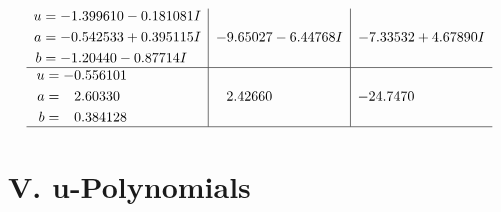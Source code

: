 \documentclass[1p]{elsarticle_modified}
\theoremstyle{definition}
\begin{document}
$$\begin{array}{c|c|c}
\begin{aligned}
u &= -1.399610 - 0.181081 I \\
a &= -0.542533 + 0.395115 I \\
b &= -1.20440 - 0.87714 I\end{aligned}
 & -9.65027 - 6.44768 I & -7.33532 + 4.67890 I \\ \hline\begin{aligned}
u &= -0.556101\phantom{ +0.000000I} \\
a &= \phantom{-}2.60330\phantom{ +0.000000I} \\
b &= \phantom{-}0.384128\phantom{ +0.000000I}\end{aligned}
 & \phantom{-}2.42660\phantom{ +0.000000I} & -24.7470\phantom{ +0.000000I}\\
 \hline 
 \end{array}$$\newpage
\newpage\renewcommand{\arraystretch}{1}
\centering \section*{ V. u-Polynomials}
\end{document}
